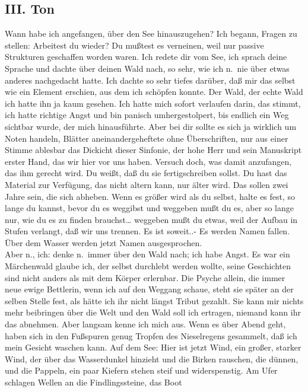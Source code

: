 \documentclass[
]{article}
\author{}
\date{\vspace{-2.5em}}
\begin{document}
\subsection{III. Ton}\label{iii.-ton}

Wann habe ich angefangen, über den See hinauszugehen? Ich begann, Fragen
zu stellen: Arbeitest du wieder? Du mußtest es verneinen, weil nur
passive Strukturen geschaffen worden waren. Ich redete dir vom See, ich
sprach deine Sprache und dachte über deinen Wald nach, so sehr, wie ich
n.~nie über etwas anderes nachgedacht hatte. Ich dachte so sehr tiefes
darüber, daß mir das selbst wie ein Element erschien, aus dem ich
schöpfen konnte. Der Wald, der echte Wald ich hatte ihn ja kaum gesehen.
Ich hatte mich sofort verlaufen darin, das stimmt, ich hatte richtige
Angst und bin panisch umhergestolpert, bis endlich ein Weg sichtbar
wurde, der mich hinausführte. Aber bei dir sollte es sich ja wirklich um
Noten handeln, Blätter aneinandergeheftete ohne Überschriften, nur aus
einer Stimme ablesbar das Dickicht dieser Sinfonie, der hohe Herr und
sein Manuskript erster Hand, das wir hier vor uns haben. Versuch doch,
was damit anzufangen, das ihm gerecht wird. Du weißt, daß du sie
fertigschreiben sollst. Du hast das Material zur Verfügung, das nicht
altern kann, nur älter wird. Das sollen zwei Jahre sein, die sich
abheben. Wenn es größer wird als du selbst, halte es fest, so lange du
kannst, bevor du es weggibst und weggeben mußt du es, aber so lange nur,
wie du es zu finden brauchst\ldots{} weggeben mußt du etwas, weil der
Aufbau in Stufen verlangt, daß wir uns trennen. Es ist soweit..- Es
werden Namen fallen. Über dem Wasser werden jetzt Namen ausgesprochen.\\
Aber n., ich: denke n.~immer über den Wald nach; ich habe Angst. Es war
ein Märchenwald glaube ich, der selbst durchlebt werden wollte, seine
Geschichten sind nicht anders als mit dem Körper erlernbar. Die Psyche
allein, die immer neue ewige Bettlerin, wenn ich auf den Weggang schaue,
steht sie später an der selben Stelle fest, als hätte ich ihr nicht
längst Tribut gezahlt. Sie kann mir nichts mehr beibringen über die Welt
und den Wald soll ich ertragen, niemand kann ihr das abnehmen. Aber
langsam kenne ich mich aus. Wenn es über Abend geht, haben sich in den
Fußspuren genug Tropfen des Nieselregens gesammelt, daß ich mein Gesicht
waschen kann. Auf dem See: Hier ist jetzt Wind, ein großer, starker
Wind, der über das Wasserdunkel hinzieht und die Birken rauschen, die
dünnen, und die Pappeln, ein paar Kiefern stehen steif und
widerspenstig. Am Ufer schlagen Wellen an die Findlingssteine, das Boot
\end{document}
